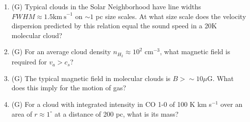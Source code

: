 \documentclass{article}
\begin{document}
\begin{enumerate}
    \begin{enumerate}
        \item (G) Typical clouds in the Solar Neighborhood have line widths $FWHM\approx 1.5 \mathrm{km~s}^{-1}$ on $\sim1$ pc size scales.
            At what size scale does the velocity dispersion predicted by this relation equal the sound speed in a 20K molecular cloud?
        \item (G) For an average cloud density $n_{H_2}\approx10^2$ cm$^{-3}$, what magnetic field is required for $v_{a} > c_s$?
        \item (G) The typical magnetic field in molecular clouds is $B>\sim10 \mu\mathrm{G}$.  What does this imply for the motion of gas?
        \item (G) For a cloud with integrated intensity in CO 1-0 of 100 K km s$^{-1}$ over an area of $r\approx1^{\circ}$
            at a distance of 200 pc, what is its mass?

    \end{enumerate}


\end{enumerate}




\end{document}
